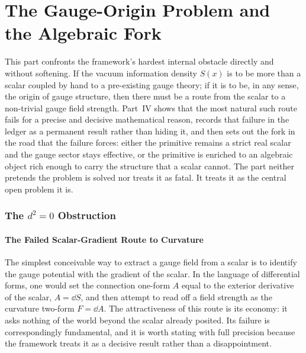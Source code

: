 \documentclass[12pt,a4paper,twoside]{article}
\theoremstyle{plain}
\theoremstyle{definition}
\theoremstyle{remark}
\begin{document}
\part{The Gauge-Origin Problem and the Algebraic Fork}
\label{part:gauge-origin}

\noindent This part confronts the framework's hardest internal obstacle directly and without softening. If the vacuum information density $S(x)$ is to be more than a scalar coupled by hand to a pre-existing gauge theory; if it is to be, in any sense, the origin of gauge structure, then there must be a route from the scalar to a non-trivial gauge field strength. Part~IV shows that the most natural such route fails for a precise and decisive mathematical reason, records that failure in the ledger as a permanent result rather than hiding it, and then sets out the fork in the road that the failure forces: either the primitive remains a strict real scalar and the gauge sector stays effective, or the primitive is enriched to an algebraic object rich enough to carry the structure that a scalar cannot. The part neither pretends the problem is solved nor treats it as fatal. It treats it as the central open problem it is.

\section{The \texorpdfstring{$d^2 = 0$}{d2=0} Obstruction}
\label{sec:d2-obstruction}

\subsection{The Failed Scalar-Gradient Route to Curvature}
\label{subsec:failed-scalar-gradient}

The simplest conceivable way to extract a gauge field from a scalar is to identify the gauge potential with the gradient of the scalar. In the language of differential forms, one would set the connection one-form $A$ equal to the exterior derivative of the scalar, $A = \dd S$, and then attempt to read off a field strength as the curvature two-form $F = \dd A$. The attractiveness of this route is its economy: it asks nothing of the world beyond the scalar already posited. Its failure is correspondingly fundamental, and it is worth stating with full precision because the framework treats it as a decisive result rather than a disappointment.
\end{document}
